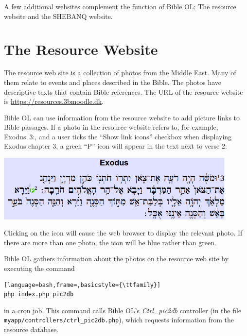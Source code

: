 \documentclass[11pt,oneside,a4paper]{memoir}
\newcommand*{\bibleref}[3]{#1~#2\thinspace:\thinspace#3}
\begin{document}
A few additional websites complement the function of Bible OL: The resource website and the SHEBANQ
website.



\section{The Resource Website}\label{sec-resource-web}

The resource web site is a collection of photos from the Middle East. Many of them relate to events
and places described in the Bible. The photos have descriptive texts that contain Bible references.
The URL of the resource website is \url{https://resources.3bmoodle.dk}.

Bible OL can use information from the resource website to add picture links to Bible passages. If a
photo in the resource website refers to, for example, \bibleref{Exodus}{3}{2}, and a user ticks the
``Show link icons'' checkbox when displaying Exodus chapter 3, a green ``P'' icon will appear in the
text next to verse 2:

\begin{center}
\includegraphics[width=0.9\textwidth]{exodus3.png}
\end{center}

Clicking on the icon will cause the web browser to display the relevant photo. If there are more
than one photo, the icon will be blue rather than green.

Bible OL gathers information about the photos on the resource web site by executing the command

\begin{lstlisting}[language=bash,frame=,basicstyle={\ttfamily}]
php index.php pic2db
\end{lstlisting}

\noindent
in a cron job. This command calls Bible OL's \emph{Ctrl\_pic2db} controller (in the file
\texttt{myapp/\allowbreak{}controllers/\allowbreak{}ctrl\_pic2db.php}), which requests information from the resource database.
\end{document}
